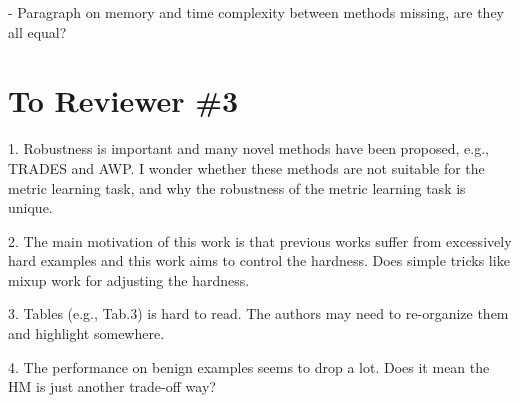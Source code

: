 \documentclass[10pt,twocolumn,letterpaper]{article}
\begin{document}
- Paragraph on memory and time complexity between methods missing, are they all equal?

\section{To Reviewer \#3}

1. Robustness is important and many novel methods have been proposed, e.g., TRADES and AWP. I wonder whether these methods are not suitable for the metric learning task, and why the robustness of the metric learning task is unique.

2. The main motivation of this work is that previous works suffer from excessively hard examples and this work aims to control the hardness. Does simple tricks like mixup work for adjusting the hardness.

3. Tables (e.g., Tab.3) is hard to read. The authors may need to re-organize them and highlight somewhere.

4. The performance on benign examples seems to drop a lot. Does it mean the HM is just another trade-off way?

{\small


}
\end{document}
